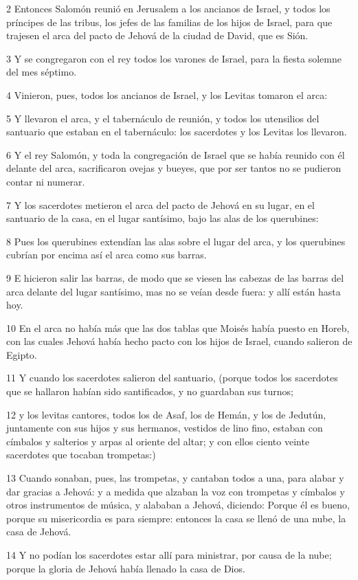 \par 2 Entonces Salomón reunió en Jerusalem a los ancianos de Israel, y todos los príncipes de las tribus, los jefes de las familias de los hijos de Israel, para que trajesen el arca del pacto de Jehová de la ciudad de David, que es Sión.
\par 3 Y se congregaron con el rey todos los varones de Israel, para la fiesta solemne del mes séptimo.
\par 4 Vinieron, pues, todos los ancianos de Israel, y los Levitas tomaron el arca:
\par 5 Y llevaron el arca, y el tabernáculo de reunión, y todos los utensilios del santuario que estaban en el tabernáculo: los sacerdotes y los Levitas los llevaron.
\par 6 Y el rey Salomón, y toda la congregación de Israel que se había  reunido con él delante del arca, sacrificaron ovejas y bueyes, que por ser tantos no se pudieron contar ni numerar.
\par 7 Y los sacerdotes metieron el arca del pacto de Jehová en su lugar, en el santuario de la casa, en el lugar santísimo, bajo las alas de los querubines:
\par 8 Pues los querubines extendían las alas sobre el lugar del arca, y los querubines cubrían por encima así el arca como sus barras.
\par 9 E hicieron salir las barras, de modo que se viesen las cabezas de las barras del arca delante del lugar santísimo, mas no se veían desde fuera: y allí están hasta hoy.
\par 10 En el arca no había más que las dos tablas que Moisés había puesto en Horeb, con las cuales Jehová había hecho pacto con los hijos de Israel, cuando salieron de Egipto.
\par 11 Y cuando los sacerdotes salieron del santuario, (porque todos los sacerdotes que se hallaron habían sido santificados, y no guardaban sus turnos;
\par 12 y los levitas cantores, todos los de Asaf, los de Hemán, y los de Jedutún, juntamente con sus hijos y sus hermanos, vestidos de lino fino, estaban con címbalos y salterios y arpas al oriente del altar; y con ellos ciento veinte sacerdotes que tocaban trompetas:)
\par 13 Cuando sonaban, pues, las trompetas, y cantaban todos  a  una, para alabar y dar gracias  a  Jehová: y a medida que alzaban la voz con trompetas y címbalos y otros instrumentos de música, y alababan  a  Jehová, diciendo: Porque él es bueno, porque su misericordia es para siempre: entonces la casa se llenó de una nube, la casa de Jehová.
\par 14 Y no podían los sacerdotes estar allí para ministrar, por causa de la nube; porque la gloria de Jehová había llenado la casa de Dios. 

